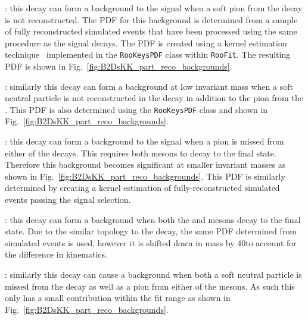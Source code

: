 \begin{description}
\item \decay{\Bsb}{\Dsp\Km\Kstarz}: this decay can form a background to the \decay{\Bp}{\Dsp\Kp\Km} signal when a soft pion from the \decay{\Kstarz}{\Kp\pim} decay is not reconstructed. The PDF for this background is determined from a sample of fully reconstructed simulated events that have been processed using the same procedure as the signal decays. The PDF is created using a kernel estimation technique~\cite{Cranmer:2000du} implemented in the \texttt{RooKeysPDF} class within \texttt{RooFit}. The resulting PDF is shown in Fig.~\ref{fig:B2DsKK_part_reco_backgrounds}.
\item \decay{\Bsb}{\Dssp\Km\Kstarz}: similarly this decay can form a background at low invariant mass when a soft neutral particle is not reconstructed in the  decay in addition to the pion from the \Kstarz. This PDF is also determined using the \texttt{RooKeysPDF} class and shown in Fig.~\ref{fig:B2DsKK_part_reco_backgrounds}.

\item \decay{\Bsb}{\Dsp\Dsm}: this decay can form a background to the signal when a pion is missed from either of the \Dsp decays. This requires both \Dsp mesons to decay to the \decay{\Dsp}{\Kp\Km\pip} final state. 
Therefore this background becomes significant at smaller invariant masses as shown in Fig.~\ref{fig:B2DsKK_part_reco_backgrounds}. 
This PDF is similarly determined by creating a kernel estimation of fully-reconstructed simulated events passing the signal selection.  

\item \decay{\Bzb}{\Dsp\Dm}: this decay can form a background when both the \Dsp and \Dm mesons decay to the \Kpm\Kmp\pipm final state. Due to the similar topology to the \decay{\Bsb}{\Dsp\Dsm} decay, the same PDF determined from simulated events is used, however it is shifted down in mass by 40\mevcc to account for the difference in kinematics.

\item \decay{\Bsb}{\Dssp\Dsm}: similarly this decay can cause a background when both a soft neutral particle is missed from the  decay as well as a pion from either of the \Dsp mesons. As such this only has a small contribution within the fit range as shown in Fig.~\ref{fig:B2DsKK_part_reco_backgrounds}. 

\end{description}


